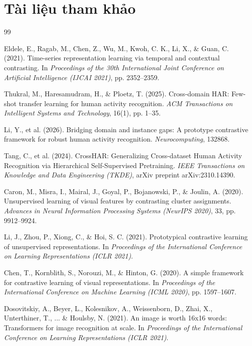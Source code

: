 \section*{Tài liệu tham khảo}

\begin{thebibliography}{99}

Eldele, E., Ragab, M., Chen, Z., Wu, M., Kwoh, C. K., Li, X., \& Guan, C. (2021). 
Time-series representation learning via temporal and contextual contrasting. 
In \textit{Proceedings of the 30th International Joint Conference on Artificial Intelligence (IJCAI 2021)}, pp. 2352--2359.

Thukral, M., Haresamudram, H., \& Ploetz, T. (2025). 
Cross-domain HAR: Few-shot transfer learning for human activity recognition. 
\textit{ACM Transactions on Intelligent Systems and Technology}, 16(1), pp. 1--35.

Li, Y., et al. (2026). 
Bridging domain and instance gaps: A prototype contrastive framework for robust human activity recognition. 
\textit{Neurocomputing}, 132868.

Tang, C., et al. (2024). 
CrossHAR: Generalizing Cross-dataset Human Activity Recognition via Hierarchical Self-Supervised Pretraining. 
\textit{IEEE Transactions on Knowledge and Data Engineering (TKDE)}, arXiv preprint arXiv:2310.14390.

Caron, M., Misra, I., Mairal, J., Goyal, P., Bojanowski, P., \& Joulin, A. (2020). 
Unsupervised learning of visual features by contrasting cluster assignments. 
\textit{Advances in Neural Information Processing Systems (NeurIPS 2020)}, 33, pp. 9912--9924.

Li, J., Zhou, P., Xiong, C., \& Hoi, S. C. (2021). 
Prototypical contrastive learning of unsupervised representations. 
In \textit{Proceedings of the International Conference on Learning Representations (ICLR 2021)}.

Chen, T., Kornblith, S., Norouzi, M., \& Hinton, G. (2020). 
A simple framework for contrastive learning of visual representations. 
In \textit{Proceedings of the International Conference on Machine Learning (ICML 2020)}, pp. 1597--1607.

Dosovitskiy, A., Beyer, L., Kolesnikov, A., Weissenborn, D., Zhai, X., Unterthiner, T., ... \& Houlsby, N. (2021). 
An image is worth 16x16 words: Transformers for image recognition at scale. 
In \textit{Proceedings of the International Conference on Learning Representations (ICLR 2021)}.


\end{thebibliography}
